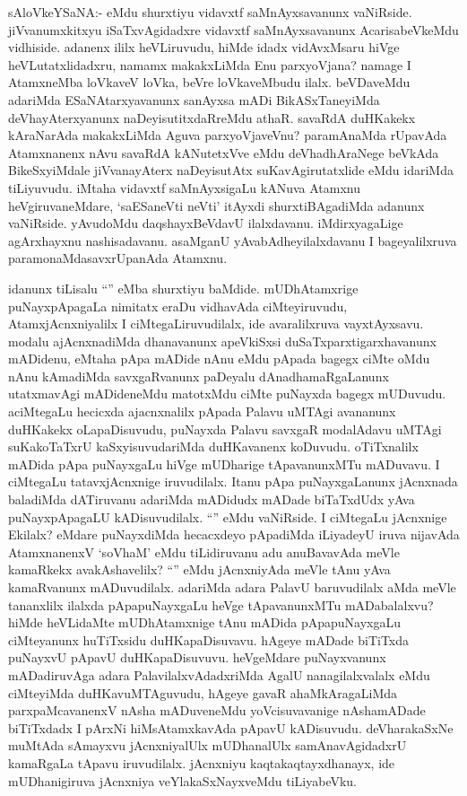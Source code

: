 \begin{artha}
sAloVkeYSaNA:- eMdu shurxtiyu vidavxtf saMnAyxsavanunx vaNiRside. jiVvanumxkitxyu iSaTxvAgidadxre vidavxtf saMnAyxsavanunx AcarisabeVkeMdu vidhiside. adanenx ililx heVLiruvudu, hiMde idadx vidAvxMsaru hiVge heVLutatxlidadxru, namamx makakxLiMda Enu parxyoVjana? namage I AtamxneMba loVkaveV loVka, beVre loVkaveMbudu ilalx. beVDaveMdu adariMda ESaNAtarxyavanunx sanAyxsa mADi BikASxTaneyiMda deVhayAterxyanunx naDeyisutitxdaRreMdu athaR. savaRdA duHKakekx kAraNarAda makakxLiMda Aguva parxyoVjaveVnu? paramAnaMda rUpavAda Atamxnanenx nAvu savaRdA kANutetxVve eMdu deVhadhAraNege beVkAda BikeSxyiMdale jiVvanayAterx naDeyisutAtx suKavAgirutatxlide eMdu idariMda tiLiyuvudu. iMtaha vidavxtf saMnAyxsigaLu kANuva Atamxnu heVgiruvaneMdare, `saESaneVti neVti' itAyxdi shurxtiBAgadiMda adanunx vaNiRside. yAvudoMdu daqshayxBeVdavU ilalxdavanu. iMdirxyagaLige agArxhayxnu nashisadavanu. asaMganU yAvabAdheyilalxdavanu I bageyalilxruva paramonaMdasavxrUpanAda Atamxnu.
\end{artha}


\begin{artha}
idanunx tiLisalu ``\stext'' eMba shurxtiyu baMdide. mUDhAtamxrige puNayxpApagaLa nimitatx eraDu vidhavAda ciMteyiruvudu, AtamxjAcnxniyalilx I ciMtegaLiruvudilalx, ide avaralilxruva vayxtAyxsavu. modalu ajAcnxnadiMda dhanavanunx apeVkiSxsi duSaTxparxtigarxhavanunx mADidenu, eMtaha pApa mADide nAnu eMdu pApada bagegx ciMte oMdu nAnu kAmadiMda savxgaRvanunx paDeyalu dAnadhamaRgaLanunx utatxmavAgi mADideneMdu matotxMdu ciMte puNayxda bagegx mUDuvudu. aciMtegaLu hecicxda ajacnxnalilx pApada Palavu uMTAgi avananunx duHKakekx oLapaDisuvudu, puNayxda Palavu savxgaR modalAdavu uMTAgi suKakoTaTxrU kaSxyisuvudariMda duHKavanenx koDuvudu. oTiTxnalilx mADida pApa puNayxgaLu hiVge mUDharige tApavanunxMTu mADuvavu. I ciMtegaLu tatavxjAcnxnige iruvudilalx. Itanu pApa puNayxgaLanunx jAcnxnada baladiMda dATiruvanu adariMda mADidudx mADade biTaTxdUdx yAva puNayxpApagaLU kADisuvudilalx. ``\stext'' eMdu vaNiRside. I ciMtegaLu jAcnxnige Ekilalx? eMdare puNayxdiMda hecacxdeyo pApadiMda iLiyadeyU iruva nijavAda AtamxnanenxV `soV\s haM' eMdu tiLidiruvanu adu anuBavavAda meVle kamaRkekx avakAshavelilx? ``\stext'' eMdu jAcnxniyAda meVle tAnu yAva kamaRvanunx mADuvudilalx. adariMda adara PalavU baruvudilalx aMda meVle tananxlilx ilalxda pApapuNayxgaLu heVge tApavanunxMTu mADabalalxvu? hiMde heVLidaMte mUDhAtamxnige tAnu mADida pApapuNayxgaLu ciMteyanunx huTiTxsidu duHKapaDisuvavu. hAgeye mADade biTiTxda puNayxvU pApavU duHKapaDisuvuvu. heVgeMdare puNayxvanunx mADadiruvAga adara PalavilalxvAdadxriMda AgalU nanagilalxvalalx eMdu ciMteyiMda duHKavuMTAguvudu, hAgeye gavaR ahaMkAragaLiMda parxpaMcavanenxV nAsha mADuveneMdu yoVcisuvavanige nAshamADade biTiTxdadx I pArxNi hiMsAtamxkavAda pApavU kADisuvudu. deVharakaSxNe muMtAda sAmayxvu jAcnxniyalUlx mUDhanalUlx samAnavAgidadxrU kamaRgaLa tApavu iruvudilalx. jAcnxniyu kaqtakaqtayxdhanayx, ide mUDhanigiruva jAcnxniya veYlakaSxNayxveMdu tiLiyabeVku.
\end{artha}

